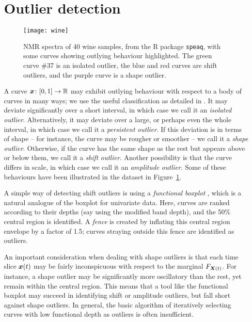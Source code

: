 \section{Outlier detection}
\label{sec:functional_outlier}

\begin{figure}
    \centering
    \texttt{[image: wine]}
    \caption{
        NMR spectra of 40 wine samples\protect\footnotemark, from the R
        package \texttt{speaq}, with some curves showing outlying behaviour
        highlighted.
        The green curve \#37 is an isolated outlier, the blue and red curves
        are shift outliers, and the purple curve is a shape outlier.
    }
    \label{fig:wine}
\end{figure}

A curve $\bm{x}\colon [0, 1] \to \mathbb{R}$ may exhibit outlying behaviour with respect
to a body of curves in many ways; we use the useful classification as detailed
in \textcite{hubert-rousseeuw-segaert-2015}.
It may deviate significantly over a short interval, in which case we call it
an \emph{isolated outlier}.
Alternatively, it may deviate over a large, or perhaps even the whole
interval, in which case we call it a \emph{persistent outlier}.
If this deviation is in terms of shape -- for instance, the curve may be
rougher or smoother -- we call it a \emph{shape outlier}.
Otherwise, if the curve has the same shape as the rest but appears above or
below them, we call it a \emph{shift outlier}.
Another possibility is that the curve differs in scale, in which case we call
it an \emph{amplitude outlier}.
Some of these behaviours have been illustrated in the dataset in
Figure~\ref{fig:wine}.

A simple way of detecting shift outliers is using a \emph{functional boxplot}
\parencite{sun-genton-2011}, which is a natural analogue of the boxplot for
univariate data.
Here, curves are ranked according to their depths (say using the modified band
depth), and the 50\% central region is identified.
A \emph{fence} is created by inflating this central region envelope by a
factor of 1.5; curves straying outside this fence are identified as outliers.

An important consideration when dealing with shape outliers is that each time
slice $\bm{x}(t)$ may be fairly inconspicuous with respect to the marginal
$F_{\bm{X}(t)}$.
For instance, a shape outlier may be significantly more oscillatory than the
rest, yet remain within the central region.
This means that a tool like the functional boxplot may succeed in identifying
shift or amplitude outliers, but fall short against shape outliers.
In general, the basic algorithm of iteratively selecting curves with low
functional depth as outliers is often insufficient.

